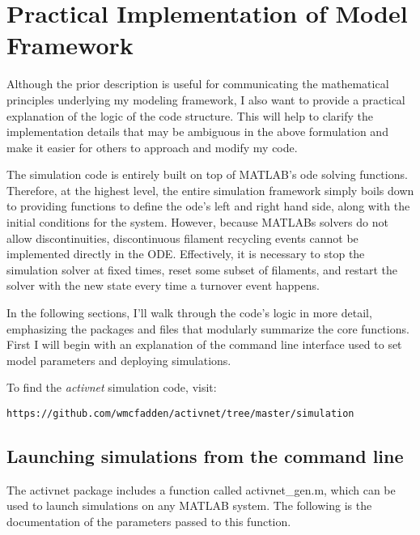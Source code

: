 

\section{Practical Implementation of Model Framework}

Although the prior description is useful for communicating the mathematical principles underlying my modeling framework, I also want to provide a practical explanation of the logic of the code structure.  This will help to clarify the implementation details that may be ambiguous in the above formulation and make it easier for others to approach and modify my code.

The simulation code is entirely built on top of MATLAB's ode solving functions.  Therefore, at the highest level, the entire simulation framework simply boils down to providing functions to define the ode's left and right hand side, along with the initial conditions for the system.  However, because MATLABs solvers do not allow discontinuities, discontinuous filament recycling events cannot be implemented directly in the ODE.  Effectively, it is necessary to stop the simulation solver at fixed times, reset some subset of filaments, and restart the solver with the new state every time a turnover event happens.


In the following sections, I'll walk through the code's logic in more detail, emphasizing the packages and files that modularly summarize the core functions.  First I will begin with an explanation of the command line interface used to set model parameters and deploying simulations.

To find the \textit{activnet} simulation code, visit:
\begin{verbatim}
https://github.com/wmcfadden/activnet/tree/master/simulation
\end{verbatim}

\subsection{Launching simulations from the command line}



The activnet package includes a function called activnet\_gen.m, which can be used to launch simulations on any MATLAB system.  The following is the documentation of the parameters passed to this function.

